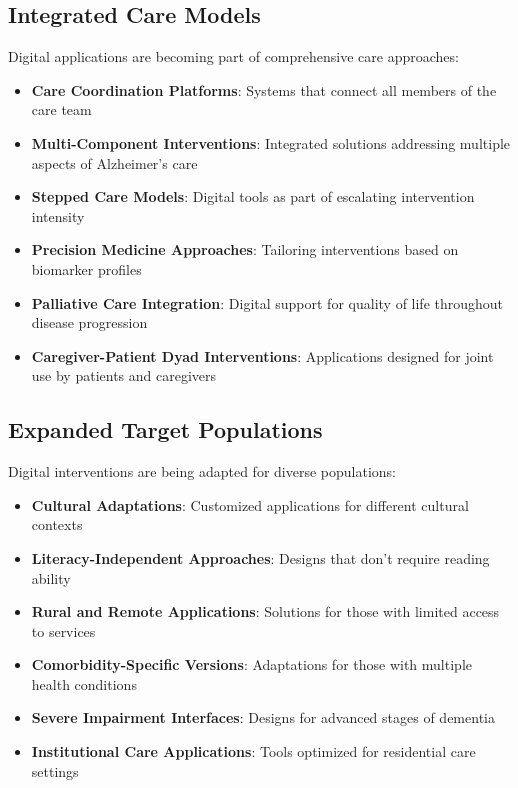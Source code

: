 \subsection{Integrated Care Models}
Digital applications are becoming part of comprehensive care approaches:

\begin{itemize}
    \item \textbf{Care Coordination Platforms}: Systems that connect all members of the care team
    
    \item \textbf{Multi-Component Interventions}: Integrated solutions addressing multiple aspects of Alzheimer's care
    
    \item \textbf{Stepped Care Models}: Digital tools as part of escalating intervention intensity
    
    \item \textbf{Precision Medicine Approaches}: Tailoring interventions based on biomarker profiles
    
    \item \textbf{Palliative Care Integration}: Digital support for quality of life throughout disease progression
    
    \item \textbf{Caregiver-Patient Dyad Interventions}: Applications designed for joint use by patients and caregivers
\end{itemize}

\subsection{Expanded Target Populations}
Digital interventions are being adapted for diverse populations:

\begin{itemize}
    \item \textbf{Cultural Adaptations}: Customized applications for different cultural contexts
    
    \item \textbf{Literacy-Independent Approaches}: Designs that don't require reading ability
    
    \item \textbf{Rural and Remote Applications}: Solutions for those with limited access to services
    
    \item \textbf{Comorbidity-Specific Versions}: Adaptations for those with multiple health conditions
    
    \item \textbf{Severe Impairment Interfaces}: Designs for advanced stages of dementia
    
    \item \textbf{Institutional Care Applications}: Tools optimized for residential care settings
\end{itemize}

